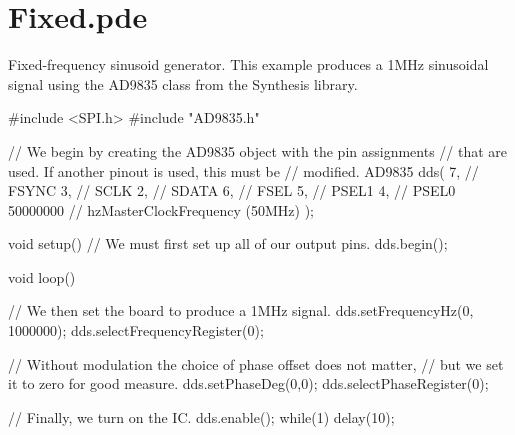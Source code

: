 \hypertarget{_fixed_8pde-example}{
\section{Fixed.pde}
}
Fixed-\/frequency sinusoid generator. This example produces a 1MHz sinusoidal signal using the AD9835 class from the Synthesis library.


\begin{DoxyCodeInclude}

#include <SPI.h>
#include "AD9835.h"

// We begin by creating the AD9835 object with the pin assignments
// that are used.  If another pinout is used, this must be
// modified.
AD9835 dds(
        7, // FSYNC
        3, // SCLK
        2, // SDATA
        6, // FSEL
        5, // PSEL1
        4, // PSEL0
        50000000 // hzMasterClockFrequency (50MHz)
    );

void setup()
{
    // We must first set up all of our output pins.
    dds.begin();
}

void loop()
{
  

    // We then set the board to produce a 1MHz signal.
    dds.setFrequencyHz(0, 1000000);
    dds.selectFrequencyRegister(0);

    // Without modulation the choice of phase offset does not matter,
    // but we set it to zero for good measure.
    dds.setPhaseDeg(0,0);
    dds.selectPhaseRegister(0);

    // Finally, we turn on the IC.
    dds.enable();
    while(1)
    {
        delay(10);
    }
}
\end{DoxyCodeInclude}
 